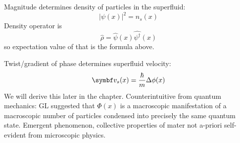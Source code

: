 \documentclass[../notes.tex]{subfiles}
\begin{document}
Magnitude determines density of particles in the superfluid:
\begin{equation}
	\vert \psi(x) \vert^2 = n_s (x)
\end{equation}
Density operator is
\begin{equation}
	\hat{\rho} = \hat{\psi} (x) \hat{\psi^{\dagger}} (x)
\end{equation}
so expectation value of that is the formula above.

Twist/gradient of phase determines superfluid velocity:
\begin{equation}
	\vb{v}_s (x) = \frac{\hbar}{m} \Delta \phi (x)
\end{equation}
We will derive this later in the chapter.
Counterintuitive from quantum mechanics: GL suggested that \(\Phi(x)\) is a macroscopic manifestation of a macroscopic number of particles condensed into precisely the same quantum state.
Emergent phenomenon, collective properties of mater not a-priori self-evident from microscopic physics.
\end{document}
